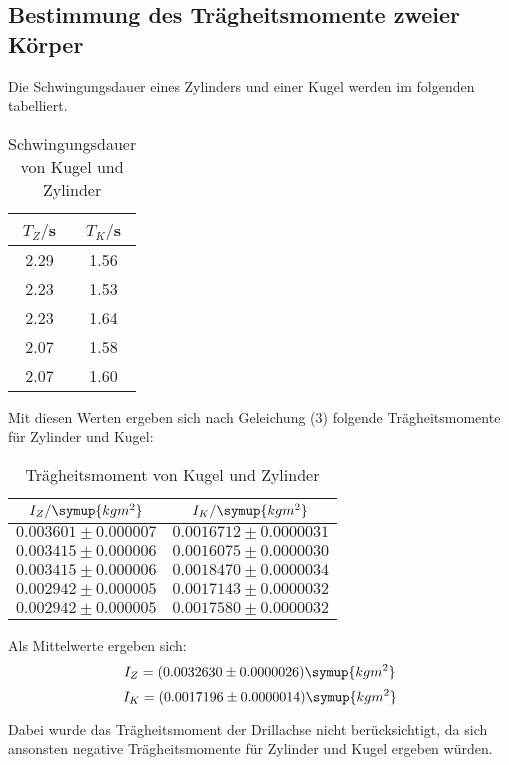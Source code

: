 \subsection{Bestimmung des Trägheitsmomente zweier Körper}
Die Schwingungsdauer eines Zylinders und einer Kugel werden im folgenden tabelliert.
\begin{table}[H]
  \centering
  \caption{Schwingungsdauer von Kugel und Zylinder}
  \label{tab:Schwingungsdauer von Kugel und Zylinder}
  \begin{tabular}{c c}
    \toprule
    $T_Z/$s & $T_K/$s \\
    \midrule
    2.29 & 1.56 \\
    2.23 & 1.53 \\
    2.23 & 1.64 \\
    2.07 & 1.58 \\
    2.07 & 1.60 \\
    \bottomrule
  \end{tabular}
\end{table}

Mit diesen Werten ergeben sich nach Geleichung (3) folgende Trägheitsmomente
für Zylinder und Kugel:
\begin{table}[H]
  \centering
  \caption{Trägheitsmoment von Kugel und Zylinder}
  \label{tab:Trägheitsmoment von Kugel und Zylinder}
  \begin{tabular}{c c}
    \toprule
    $I_Z/\symup{kgm^2}$ & $I_K/\symup{kgm^2}$ \\
    \midrule
    $0.003601 \pm 0.000007$ & $0.0016712 \pm 0.0000031$ \\
    $0.003415 \pm 0.000006$ & $0.0016075 \pm 0.0000030$ \\
    $0.003415 \pm 0.000006$ & $0.0018470 \pm 0.0000034$ \\
    $0.002942 \pm 0.000005$ & $0.0017143 \pm 0.0000032$ \\
    $0.002942 \pm 0.000005$ & $0.0017580 \pm 0.0000032$ \\
    \bottomrule
  \end{tabular}
\end{table}

Als Mittelwerte ergeben sich:
\begin{equation}
  I_Z = (0.0032630 \pm 0.0000026) \symup{kgm^2}
\end{equation}
\begin{equation}
  I_K = (0.0017196 \pm 0.0000014) \symup{kgm^2}
\end{equation}

Dabei wurde das Trägheitsmoment der Drillachse nicht berücksichtigt, da sich
ansonsten negative Trägheitsmomente für Zylinder und Kugel ergeben würden.


